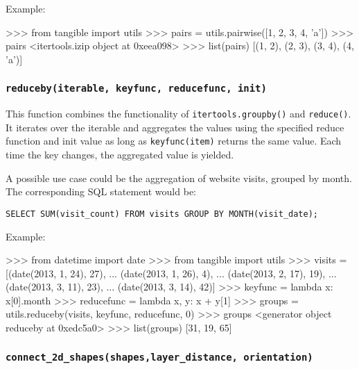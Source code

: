 \vspace{.5\baselineskip}

\noindent Example:

\vspace{.5\baselineskip}
\begin{pythoncode}
>>> from tangible import utils
>>> pairs = utils.pairwise([1, 2, 3, 4, 'a'])
>>> pairs
<itertools.izip object at 0xeea098>
>>> list(pairs)
[(1, 2), (2, 3), (3, 4), (4, 'a')]
\end{pythoncode}


\subsubsection{\texttt{reduceby(iterable, keyfunc, reducefunc, init)}}

This function combines the functionality of \texttt{itertools.groupby()} and
\texttt{reduce()}. It iterates over the iterable and aggregates the values using
the specified reduce function and init value as long as \texttt{keyfunc(item)}
returns the same value. Each time the key changes, the aggregated value is
yielded.

A possible use case could be the aggregation of website visits, grouped by
month. The corresponding SQL statement would be:

\vspace{.5\baselineskip}
\begin{verbatim}
SELECT SUM(visit_count) FROM visits GROUP BY MONTH(visit_date);
\end{verbatim}

\noindent Example:

\vspace{.5\baselineskip}
\begin{pythoncode}
>>> from datetime import date
>>> from tangible import utils
>>> visits = [(date(2013, 1, 24), 27),
...           (date(2013, 1, 26), 4),
...           (date(2013, 2, 17), 19),
...           (date(2013, 3, 11), 23),
...           (date(2013, 3, 14), 42)]
>>> keyfunc = lambda x: x[0].month
>>> reducefunc = lambda x, y: x + y[1]
>>> groups = utils.reduceby(visits, keyfunc, reducefunc, 0)
>>> groups
<generator object reduceby at 0xedc5a0>
>>> list(groups)
[31, 19, 65]
\end{pythoncode}


\subsubsection{\texttt{connect\_2d\_shapes(shapes,layer\_distance, orientation)}}

